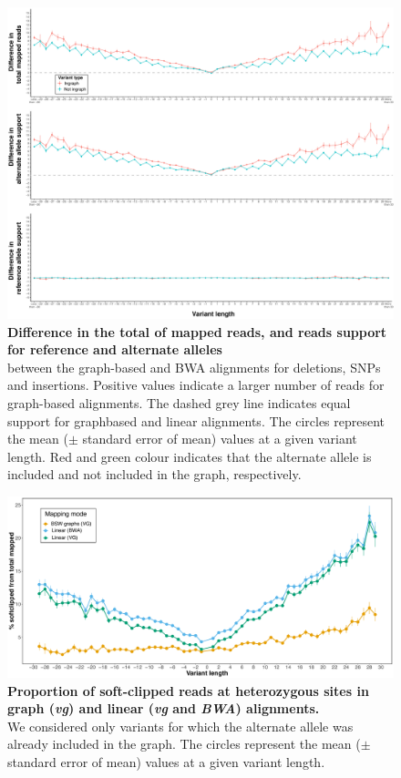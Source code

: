 \documentclass[../main.tex]{subfiles}
\begin{document}
\begin{flushleft}
\begin{figure}[!htb]
    \centering
    \includegraphics[width=\textwidth]{paper2/supplement/sp315.pdf}
    \caption[Read support difference between reference and alternate alleles]{\textbf{Difference in the total of mapped reads, and reads support for
    reference and alternate alleles} \\
    \small{between the graph-based and BWA alignments for
    deletions, SNPs and insertions. Positive values indicate a larger number of reads for
    graph-based alignments. The dashed grey line indicates equal support for graphbased and linear alignments. The circles represent the mean ($\pm$ standard error of
    mean) values at a given variant length. Red and green colour indicates that the
    alternate allele is included and not included in the graph, respectively. }}
    \label{sup_fig:s315}
\end{figure}

\begin{figure}[!htb]
    \centering
    \includegraphics[width=\textwidth]{paper2/supplement/sp316.pdf}
    \caption[Proportion of soft-clipped reads]{\textbf{Proportion of soft-clipped reads at heterozygous sites in graph
    (\emph{vg}) and linear (\emph{vg} and \emph{BWA}) alignments.} \\
    \small{We considered only variants for which
    the alternate allele was already included in the graph. The circles represent the
    mean ($\pm$ standard error of mean) values at a given variant length.}}
    \label{sup_fig:s316}
\end{figure}


\end{flushleft}
\end{document}
